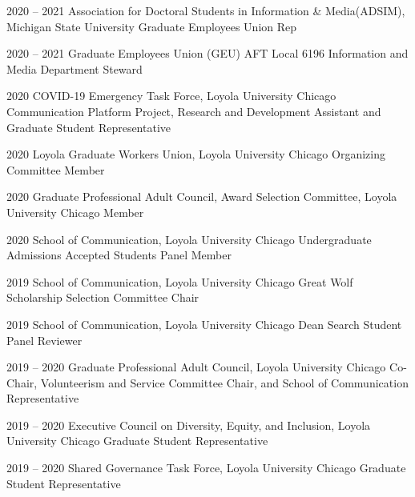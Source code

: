 \begin{cvskills}
    \cvskill
    {2020 -- 2021} %
    {Association for Doctoral Students in Information \& Media(ADSIM), Michigan State University } %
    {Graduate Employees Union Rep } %

    \cvskill
    {2020 -- 2021} %
    {Graduate Employees Union (GEU) AFT Local 6196} %
    {Information and Media Department Steward } %

    \cvskill
    {2020} %
    {COVID-19 Emergency Task Force, Loyola University Chicago } %
    {Communication Platform Project, Research and Development Assistant and Graduate Student Representative } %
    
    \cvskill
    {2020} %
    {Loyola Graduate Workers Union, Loyola University Chicago} %
    {Organizing Committee Member } %

    \cvskill
    {2020} %
    {Graduate Professional Adult Council, Award Selection Committee, Loyola University Chicago} %
    {Member } %

    \cvskill
    {2020} %
    {School of Communication, Loyola University Chicago} %
    {Undergraduate Admissions Accepted Students Panel Member} %

    \cvskill
    {2019} %
    {School of Communication, Loyola University Chicago} %
    {Great Wolf Scholarship Selection Committee Chair} %

    \cvskill
    {2019} %
    {School of Communication, Loyola University Chicago} %
    {Dean Search Student Panel Reviewer} %

    \cvskill
    {2019 -- 2020} %
    {Graduate Professional Adult Council, Loyola University Chicago} %
    {Co-Chair, Volunteerism and Service Committee Chair, and School of Communication Representative } %
 
    \cvskill
    {2019 -- 2020} %
    {Executive Council on Diversity, Equity, and Inclusion, Loyola University Chicago} %
    {Graduate Student Representative} %

    \cvskill
    {2019 -- 2020} %
    {Shared Governance Task Force, Loyola University Chicago} %
    {Graduate Student Representative} %
    

\end{cvskills}
